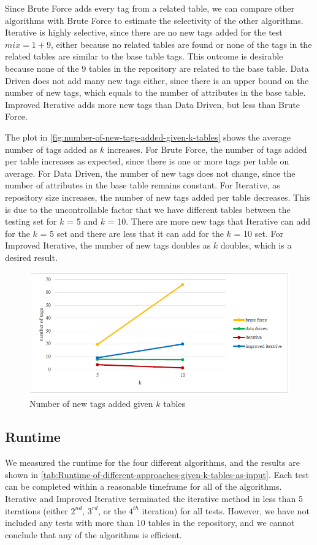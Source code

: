 Since Brute Force adds every tag from a related table, we can compare other algorithms with Brute Force to estimate the selectivity of the other algorithms. Iterative is highly selective, since there are no new tags added for the test $mix = 1+9$, either because no related tables are found or none of the tags in the related tables are similar to the base table tags. This outcome is desirable because none of the 9 tables in the repository are related to the base table. Data Driven does not add many new tags either, since there is an upper bound on the number of new tags, which equals to the number of attributes in the base table. Improved Iterative adds more new tags than Data Driven, but less than Brute Force.

The plot in \autoref{fig:number-of-new-tags-added-given-k-tables} shows the average number of tags added as $k$ increases. For Brute Force, the number of tags added per table increases as expected, since there is one or more tags per table on average. For Data Driven, the number of new tags does not change, since the number of attributes in the base table remains constant. For Iterative, as repository size increases, the number of new tags added per table decreases. This is due to the uncontrollable factor that we have different tables between the testing set for $k$ = 5 and $k$ = 10. There are more new tags that Iterative can add for the $k$ = 5 set and there are less that it can add for the $k$ = 10 set. For Improved Iterative, the number of new tags doubles as $k$ doubles, which is a desired result.

\begin{figure}
  \centering
  \includegraphics[width=5in]{figures/number-of-new-tags-added-given-k-tables.png}
  \caption{Number of new tags added given $k$ tables}
  \label{fig:number-of-new-tags-added-given-k-tables}
\end{figure}

\subsection{Runtime}
We measured the runtime for the four different algorithms, and the results are shown in \autoref{tab:Runtime-of-different-approaches-given-k-tables-as-input}. Each test can be completed within a reasonable timeframe for all of the algorithms. Iterative and Improved Iterative terminated the iterative method in less than 5 iterations (either $2^{nd}$, $3^{rd}$, or the $4^{th}$ iteration) for all tests. However, we have not included any tests with more than 10 tables in the repository, and we cannot conclude that any of the algorithms is efficient.

